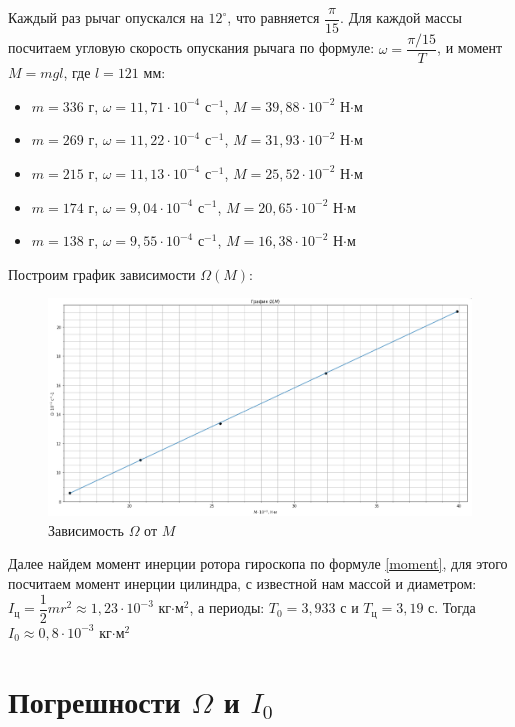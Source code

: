 \documentclass[a4paper,12pt]{article}
\begin{document}
	Каждый раз рычаг опускался на $12^\circ$, что равняется $\dfrac{\pi}{15}$. Для каждой массы посчитаем угловую скорость опускания рычага по формуле: $\omega = \dfrac{\pi/15}{T}$, и момент $M = mgl$, где $l = 121$ мм:
	\begin{itemize}
		\item $m = 336$ г, $\omega = 11,71\cdot 10^{-4}$ $\text{с}^{-1}$, $M = 39,88\cdot10^{-2}$ Н$\cdot$м
		\item $m = 269$ г, $\omega = 11,22\cdot 10^{-4}$ $\text{с}^{-1}$, $M = 31,93\cdot10^{-2}$ Н$\cdot$м
		\item $m = 215$ г, $\omega = 11,13\cdot 10^{-4}$ $\text{с}^{-1}$, $M = 25,52\cdot10^{-2}$ Н$\cdot$м
		\item $m = 174$ г, $\omega = 9,04\cdot 10^{-4}$ $\text{с}^{-1}$, $M = 20,65\cdot10^{-2}$ Н$\cdot$м
		\item $m = 138$ г, $\omega = 9,55\cdot 10^{-4}$ $\text{с}^{-1}$, $M = 16,38\cdot10^{-2}$ Н$\cdot$м
	\end{itemize}
	
	Построим график зависимости $\Omega(M)$:
	\begin{figure}[h!]
		\includegraphics[scale=0.53]{1.2.5 graph}
		\caption{Зависимость $ \Omega $ от $ M $}
		\label{graph}
	\end{figure}

	Далее найдем момент инерции ротора гироскопа по формуле \eqref{moment}, для этого посчитаем момент инерции цилиндра, с известной нам массой и диаметром: $I_\text{ц} = \dfrac{1}{2}mr^2 \approx 1,23\cdot 10^{-3}$ кг$\cdot \text{м}^2$, а периоды: $T_0 = 3,933$ с и $T_\text{ц} = 3,19$ с. Тогда $I_0 \approx 0,8\cdot 10^{-3}$ кг$\cdot \text{м}^2$
	
	\section{Погрешности $\Omega$ и $I_0$}
	
\end{document}
